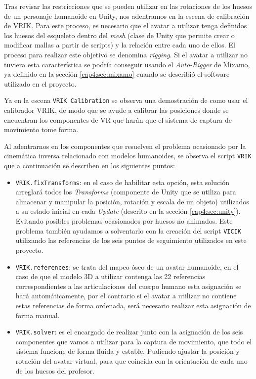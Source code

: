 Tras revisar las restricciones que se pueden utilizar en las rotaciones de los huesos de un personaje humanoide en Unity, nos adentramos en la escena de calibración de VRIK. Para este proceso, es necesario que el avatar a utilizar tenga definidos los huesos del esqueleto dentro del \textit{mesh} (clase de Unity que permite crear o modificar mallas a partir de scripts) y la relación entre cada uno de ellos. El proceso para realizar este objetivo se denomina \textit{rigging}. Si el avatar a utilizar no tuviera esta característica se podría conseguir usando el \textit{Auto-Rigger} de Mixamo, ya definido en la sección \ref{cap4:sec:mixamo}  cuando se describió el software utilizado en el proyecto.

Ya en la escena \texttt{VRIK Calibration} se observa una demostración de como usar el calibrador VRIK, de modo que se ayude a calibrar las posiciones donde se encuentran los componentes de VR que harán que el sistema de captura de movimiento tome forma.

Al adentrarnos en los componentes que resuelven el problema ocasionado por la cinemática inversa relacionado con modelos humanoides, se observa el script \texttt{VRIK} que a continuación se describen en los siguientes puntos:

\begin{itemize}
    \item \texttt{VRIK.fixTransforms}: en el caso de habilitar esta opción, esta solución arreglará todos los \textit{Transforms} (componente de Unity que se utiliza para almacenar y manipular la posición, rotación y escala de un objeto) utilizados a su estado inicial en cada \textit{Update} (descrito en la sección \ref{cap4:sec:unity}). Evitando posibles problemas ocasionados por huesos no animados. Este problema también ayudamos a solventarlo con la creación del script \texttt{VICIK} utilizando las referencias de los seis puntos de seguimiento utilizados en este proyecto.
    \item \texttt{VRIK.references}: se trata del mapeo óseo de un avatar humanoide, en el caso de que el modelo 3D a utilizar contenga las 22 referencias correspondientes a las articulaciones del cuerpo humano esta asignación se hará automáticamente, por el contrario si el avatar a utilizar no contiene estas referencias de forma ordenada, será necesario realizar esta asignación de forma manual.
    \item \texttt{VRIK.solver}: es el encargado de realizar junto con la asignación de los seis componentes que vamos a utilizar para la captura de movimiento, que todo el sistema funcione de forma fluida y estable. Pudiendo ajustar la posición y rotación del avatar virtual, para que coincida con la orientación de cada uno de los huesos del profesor.
\end{itemize}

